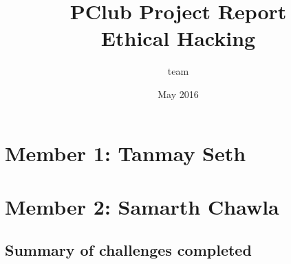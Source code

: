 \documentclass{article}
\title{
PClub Project Report
\\
Ethical Hacking
}
\author{team}
\date{May 2016}
\begin{document}
\maketitle

\newpage 

\tableofcontents

\newpage
\section*{Member 1: Tanmay Seth}

\newpage
\section*{Member 2: Samarth Chawla}
\subsection*{Summary of challenges completed}
\end{document}
